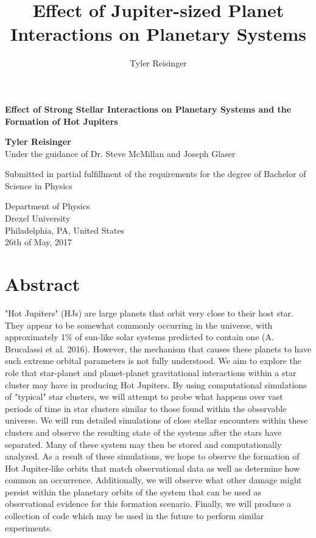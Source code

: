 \documentclass[12pt]{article}
\author{Tyler Reisinger}
\title{Effect of Jupiter-sized Planet Interactions on Planetary Systems}
\date{}
\begin{document}
\begin{titlepage}
    \begin{center}
        \vspace*{1cm}
        
        \textbf{Effect of Strong Stellar Interactions on Planetary Systems and
            the Formation of Hot Jupiters}
        
        \vspace{1.5cm}
        
        \textbf{Tyler Reisinger}\\
        Under the guidance of Dr. Steve McMillan and Joseph Glaser
        
        \vfill
        
        Submitted in partial fulfillment of the requirements for the
        degree of Bachelor of Science in Physics
        
        \vspace{0.8cm}

        Department of Physics \\
        Drexel University \\
        Philadelphia, PA, United States\\
        26th of May, 2017 
    \end{center}
\end{titlepage}

\tableofcontents

\clearpage

\section{Abstract}

"Hot Jupiters" (HJs) are large planets that orbit very close to their host star. 
They appear to be somewhat commonly occurring in the universe, with approximately 1\% 
of sun-like solar systems predicted to contain one (A. Brucalassi et al. 2016). 
However, the mechanism that causes these planets to have such extreme orbital parameters
is not fully understood. 
We aim to explore the role that star-planet and planet-planet gravitational interactions 
within a star cluster may have in producing Hot 
Jupiters. By using computational simulations of "typical" star clusters,
we will attempt to probe what happens over vast periods of time
in star clusters similar to those found within the observable universe.
We will run detailed simulations of close stellar encounters within these clusters
and observe the resulting state of the systems after the stars have separated. Many
of these system may then be stored and computationally analyzed. 
As a result of these simulations, 
we hope to observe the formation of Hot Jupiter-like orbits that
match observational data as well as determine how common an occurrence.
Additionally, we will observe what other damage might 
persist within the planetary orbits of the system that can be used as 
observational evidence for this formation scenario. Finally, we will
produce a collection of code which may be used in the future to perform similar
experiments.
\end{document}
